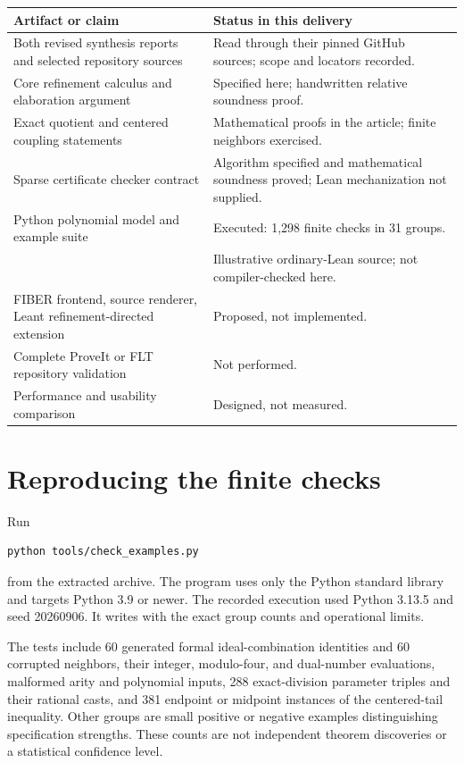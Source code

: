 \documentclass[11pt,letterpaper]{article}
\theoremstyle{definition}\newtheorem{definition}[theorem]{Definition}
\newcommand{\code}[1]{\texttt{\detokenize{#1}}}
\begin{document}
\begin{center}\small
\begin{tabularx}{\textwidth}{@{}L{2.25in}Y@{}}
\toprule
Artifact or claim & Status in this delivery\\\midrule
Both revised synthesis reports and selected repository sources & Read through their pinned GitHub sources; scope and locators recorded.\\
Core refinement calculus and elaboration argument & Specified here; handwritten relative soundness proof.\\
Exact quotient and centered coupling statements & Mathematical proofs in the article; finite neighbors exercised.\\
Sparse certificate checker contract & Algorithm specified and mathematical soundness proved; Lean mechanization not supplied.\\
Python polynomial model and example suite & Executed: 1,298 finite checks in 31 groups.\\
\code{CoreEncoding.lean} & Illustrative ordinary-Lean source; not compiler-checked here.\\
FIBER frontend, source renderer, Leant refinement-directed extension & Proposed, not implemented.\\
Complete ProveIt or FLT repository validation & Not performed.\\
Performance and usability comparison & Designed, not measured.\\
\bottomrule
\end{tabularx}
\end{center}

\section{Reproducing the finite checks}\label{app:checks}
Run
\begin{lstlisting}
python tools/check_examples.py
\end{lstlisting}
from the extracted archive. The program uses only the Python standard library and targets Python 3.9 or newer. The recorded execution used Python 3.13.5 and seed 20260906. It writes \code{evidence/checks.json} with the exact group counts and operational limits.

The tests include 60 generated formal ideal-combination identities and 60 corrupted neighbors, their integer, modulo-four, and dual-number evaluations, malformed arity and polynomial inputs, 288 exact-division parameter triples and their rational casts, and 381 endpoint or midpoint instances of the centered-tail inequality. Other groups are small positive or negative examples distinguishing specification strengths. These counts are not independent theorem discoveries or a statistical confidence level.
\end{document}
